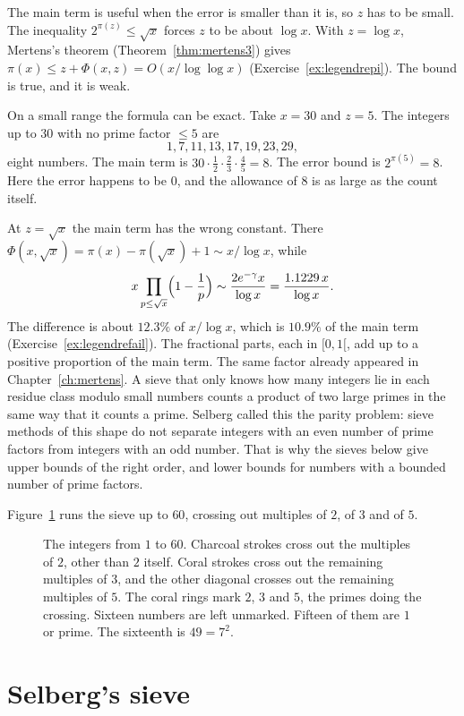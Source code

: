 The main term is useful when the error is smaller than it is, so $z$ has to be small. The inequality $2^{\pi(z)}\le\sqrt x$ forces $z$ to be about $\log x$. With $z=\log x$, Mertens's theorem (Theorem~\ref{thm:mertens3}) gives $\pi(x)\le z+\Phi(x,z)=O(x/\log\log x)$ (Exercise~\ref{ex:legendrepi}). The bound is true, and it is weak.

On a small range the formula can be exact. Take $x=30$ and $z=5$. The integers up to $30$ with no prime factor $\le5$ are
\[
1,7,11,13,17,19,23,29,
\]
eight numbers. The main term is $30\cdot\frac12\cdot\frac23\cdot\frac45=8$. The error bound is $2^{\pi(5)}=8$. Here the error happens to be $0$, and the allowance of $8$ is as large as the count itself.

At $z=\sqrt x$ the main term has the wrong constant. There $\Phi(x,\sqrt x)=\pi(x)-\pi(\sqrt x)+1\sim x/\log x$, while
\[
x\prod_{p\le\sqrt x}\Bigl(1-\frac1p\Bigr)\sim\frac{2e^{-\gamma}x}{\log x}=\frac{1.1229\,x}{\log x}.
\]
The difference is about $12.3\%$ of $x/\log x$, which is $10.9\%$ of the main term (Exercise~\ref{ex:legendrefail}). The fractional parts, each in $[0,1[$, add up to a positive proportion of the main term. The same factor already appeared in Chapter~\ref{ch:mertens}. A sieve that only knows how many integers lie in each residue class modulo small numbers counts a product of two large primes in the same way that it counts a prime. Selberg called this the parity problem: sieve methods of this shape do not separate integers with an even number of prime factors from integers with an odd number. That is why the sieves below give upper bounds of the right order, and lower bounds for numbers with a bounded number of prime factors.

Figure~\ref{fig:sieve60} runs the sieve up to $60$, crossing out multiples of $2$, of $3$ and of $5$.

\begin{figure}[ht]
\centering
{}
\caption{The integers from $1$ to $60$. Charcoal strokes cross out the multiples of $2$, other than $2$ itself. Coral strokes cross out the remaining multiples of $3$, and the other diagonal crosses out the remaining multiples of $5$. The coral rings mark $2$, $3$ and $5$, the primes doing the crossing. Sixteen numbers are left unmarked. Fifteen of them are $1$ or prime. The sixteenth is $49=7^2$.}
\label{fig:sieve60}
\end{figure}

\section{Selberg's sieve}


